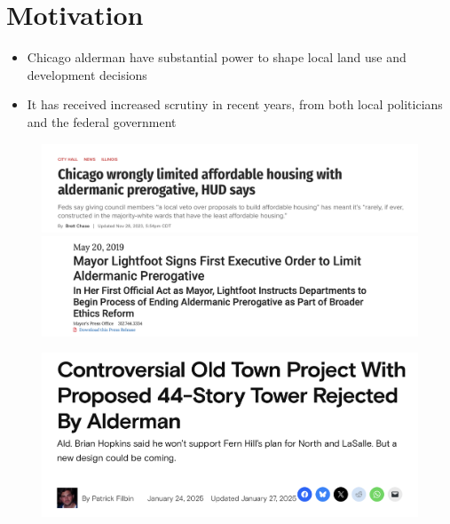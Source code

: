 \section{Motivation}

\begin{frame}
	\begin{itemize}
		\item Chicago alderman have substantial power to shape local land use and development decisions
		\item It has received increased scrutiny in recent years, from both local politicians and the federal government
	\end{itemize}
\end{frame}


\begin{frame}
    \begin{minipage}{0.5\textwidth}
        \begin{figure}
            \centering
            \includegraphics[width=\textwidth]{images/hud_report_headline.png}
			\vspace{20pt}
			\includegraphics[width=\textwidth]{images/lightfoot_order.png}
        \end{figure}
        \end{minipage}
        \hfill
        \begin{minipage}{0.48\textwidth}
        \begin{figure}
            \centering
            \includegraphics[width=\textwidth]{images/old_town_towers.png}

\end{figure}
\end{minipage}
\end{frame}
